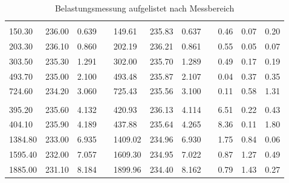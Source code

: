 \begin{table}[htbp]
\begin{tabular}{lllllllllll}
                   &                    &                    &           &                    &                    &                    &           &                     &                     &                     \\
150.30             & 236.00             & 0.639              &           & 149.61             & 235.83             & 0.637              &           & 0.46                & 0.07                & 0.20                \\
203.30             & 236.10             & 0.860              &           & 202.19             & 236.21             & 0.861              &           & 0.55                & 0.05               & 0.07               \\
303.50             & 235.30             & 1.291              &           & 302.00             & 235.70             & 1.289              &           & 0.49                & 0.17               & 0.19                \\
493.70             & 235.00             & 2.100              &           & 493.48             & 235.87             & 2.107              &           & 0.04                & 0.37               & 0.35               \\
724.60             & 234.20             & 3.060              &           & 725.43             & 235.56             & 3.100              &           & 0.11               & 0.58               & 1.31               \\
                   &                    &                    &           &                    &                    &                    &           &                     &                     &                     \\
395.20             & 235.60             & 4.132              &           & 420.93             & 236.13             & 4.114              &           & 6.51               & 0.22               & 0.43                \\
404.10             & 235.90             & 4.189              &           & 437.88             & 235.64             & 4.265              &           & 8.36               & 0.11                & 1.80               \\
1384.80            & 233.00             & 6.935              &           & 1409.02            & 234.96             & 6.930              &           & 1.75               & 0.84               & 0.06                \\
1595.40            & 232.00             & 7.057              &           & 1609.30            & 234.95             & 7.022              &           & 0.87               & 1.27               & 0.49                \\
1885.00            & 231.10             & 8.184              &           & 1899.96            & 234.40             & 8.162              &           & 0.79               & 1.43               & 0.27               
\end{tabular}
\caption{Belastungsmessung aufgelistet nach Messbereich}
\label{tab:BelasteteMessung}
\end{table}

